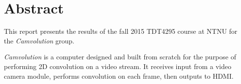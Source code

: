 \chapter*{Abstract}
This report presents the results of the fall 2015 TDT4295 course at NTNU for the \textit{Camvolution} group.

\textit{Camvolution} is a computer designed and built from scratch for the purpose of performing 2D convolution on a video stream.
It receives input from a video camera module,
performs convolution on each frame,
then outputs to HDMI.
